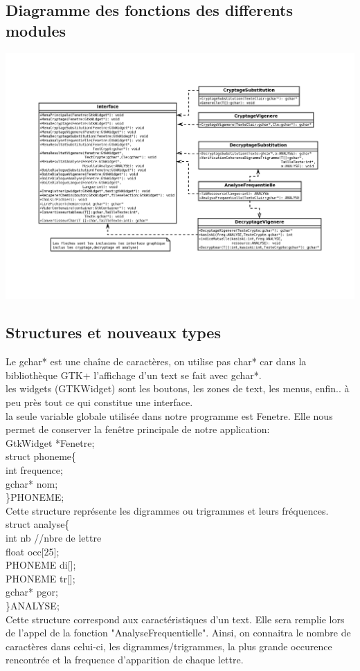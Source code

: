 \documentclass[a4]{article}
\begin{document}
		\subsection{Diagramme des fonctions des differents modules}
		\includegraphics[scale=0.8]{diaa.jpg}
		\subsection{Structures et nouveaux types}
		Le gchar* est une chaîne de caractères, on utilise pas char* car dans la bibliothèque
		GTK+ l'affichage d'un text se fait avec gchar*.\\
		
		les widgets (GTKWidget) sont les boutons, les zones de text, les menus, enfin.. à peu 
		près tout ce qui constitue une interface.\\
		
		la seule  variable globale utilisée dans notre programme est Fenetre. Elle nous permet de
		conserver la fenêtre principale de notre application:\\
		GtkWidget *Fenetre; \\
		
	struct phoneme\{\\
		int frequence;\\
		gchar* nom;\\
	\}PHONEME;\\
	Cette structure représente les digrammes ou trigrammes et leurs fréquences.\\
	
	struct analyse\{ \\
		int nb //nbre de lettre \\
		float occ[25];\\
		PHONEME di[];\\
		PHONEME tr[];\\
		gchar* pgor;\\
	\}ANALYSE;\\
	Cette structure correspond aux caractéristiques d'un text. Elle sera remplie lors de
	l'appel de la fonction "AnalyseFrequentielle". Ainsi, on connaitra
	le nombre de caractères dans celui-ci, les digrammes/trigrammes, la plus grande occurence
	rencontrée et la frequence d'apparition de chaque lettre.\\
	
\end{document}
